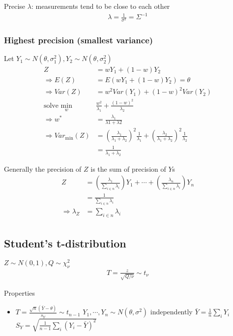     Precise $\lambda$: measurements tend to be close to each other
    \begin{align*}
        \lambda = \frac{1}{\sigma^2}
                =\Sigma^{-1}
    \end{align*}

    \subsubsection{Highest precision (smallest variance)}

    Let $Y_1\sim N(\theta, \sigma_1^2), Y_2 \sim N(\theta,
    \sigma_2^2)$
    \begin{align*}
        Z &= wY_1 + (1-w)Y_2\\
        \Rightarrow E(Z) &= E(wY_1 + (1-w)Y_2) = \theta\\
        \Rightarrow Var(Z) &= w^2 Var(Y_1) + (1-w)^2
        Var(Y_2)\\
        \text{solve } \min_w & \frac{w^2}{\lambda_1} +
        \frac{(1-w)^2}{\lambda_2}\\
        \Rightarrow w^* &=
        \frac{\lambda_1}{\lambda1+\lambda2}\\
        \Rightarrow Var_{\min}(Z) &=
        \left(\frac{\lambda_1}{\lambda_1+\lambda_2}\right)^2
        \frac{1}{\lambda_1}
        + 
        \left(\frac{\lambda_2}{\lambda_1+\lambda_2}\right)^2
        \frac{1}{\lambda_2}\\
                           &= \frac{1}{\lambda_1+\lambda_2}
    \end{align*}

    Generally the precision of $Z$ is the sum of precision
    of $Y$s
    \begin{align*}
        Z &= \left(\frac{\lambda_1}{\sum_{i\in
        n}\lambda_i}\right) Y_1 + \cdots +
        \left(\frac{\lambda_n}{\sum_{i\in
        n}\lambda_i}\right) Y_n\\
          &= \frac{1}{\sum_{i\in n}\lambda_i}\\
                    \Rightarrow \lambda_Z &= {\sum_{i\in
                    n}\lambda_i}\\
    \end{align*}

    \subsection{Student's t-distribution}

    $Z\sim N(0, 1), Q\sim \chi_\nu^2$
    \begin{align*}
        T = \frac{z}{\sqrt{Q/\nu}}\sim t_\nu
    \end{align*}

    Properties
    \begin{itemize}
        \item $T = \frac{\sqrt{n}(\bar{Y}-\theta)}{s_Y}\sim
            t_{n-1}$
            \subitem $Y_1, \cdots, Y_n \sim N(\theta,
            \sigma^2)$ independently
            \subitem $\bar{Y} = \frac{1}{n}\sum_i Y_i$
            \subitem $S_Y =
            \sqrt{\frac{1}{n-1}\sum_i(Y_i-\bar{Y})^2}$
    \end{itemize}
